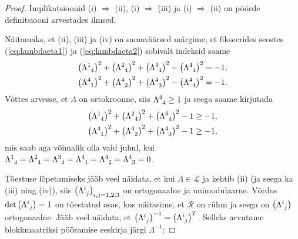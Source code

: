 \documentclass[12pt,a4paper,oneside]{article}
\theoremstyle{plain}
\theoremstyle{definition}
\numberwithin{equation}{section}
\def\L{{\mathcal L}}
\begin{document}
\begin{proof}
Implikatsioonid (i) $\Rightarrow$ (ii), (i) $\Rightarrow$ (iii) 
ja (i) $\Rightarrow$ (ii) on pöörde definitsiooni arvestades 
ilmsed.

Näitamaks, et (ii), (iii) ja (iv) on samaväärsed märgime, et 
fikseerides seostes (\ref{eq:lambdaeta1}) ja (\ref{eq:lambdaeta2}) 
sobivalt indeksid saame
\begin{align*}
\left(\Lambda\indices{^1_4}\right)^2 + 
	\left(\Lambda\indices{^2_4}\right)^2 + 
	\left(\Lambda\indices{^3_4}\right)^2 - 
	\left(\Lambda\indices{^4_4}\right)^2 = -1, \\
\left(\Lambda\indices{^4_1}\right)^2 + 
	\left(\Lambda\indices{^4_2}\right)^2 + 
	\left(\Lambda\indices{^4_3}\right)^2 - 
	\left(\Lambda\indices{^4_4}\right)^2 = -1.
\end{align*}
Võttes arvesse, et $\Lambda$ on ortokroonne, siis 
$\Lambda\indices{^4_4} \geq 1$ ja seega saame kirjutada
\begin{align*}
\left(\Lambda\indices{^1_4}\right)^2 + 
	\left(\Lambda\indices{^2_4}\right)^2 + 
	\left(\Lambda\indices{^3_4}\right)^2 - 1 \geq -1, \\
\left(\Lambda\indices{^4_1}\right)^2 + 
	\left(\Lambda\indices{^4_2}\right)^2 + 
	\left(\Lambda\indices{^4_3}\right)^2 - 1 \geq -1,
\end{align*}
mis saab aga võimalik olla vaid juhul, kui 
$\Lambda\indices{^1_4} = \Lambda\indices{^2_4} = 
\Lambda\indices{^3_4} = \Lambda\indices{^4_1} = 
\Lambda\indices{^4_2} = \Lambda\indices{^4_3} = 0$.

Tõestuse lõpetamiseks jääb veel näidata, et kui 
$\Lambda \in \L$ ja kehtib (ii) (ja seega ka (iii) ning 
(iv)), siis $\left(\Lambda\indices{^i_j}\right)_{i,j = 1, 2, 3}$ 
on ortogonaalne ja unimodulaarne. Võrdus 
$\det \left(\Lambda\indices{^i_j}\right) = 1$ on tõestatud osas, kus 
näitasime, et $\mathcal{R}$ on rühm ja seega on 
$\left(\Lambda\indices{^i_j}\right)$ ortogonaalne. 
Jääb veel näidata, et $\left(\Lambda\indices{^i_j}\right)^{-1} = 
\left(\Lambda\indices{^i_j}\right)^T$. Selleks arvutame 
blokkmaatriksi pööramise eeskirja järgi $\Lambda^{-1}$:


\end{proof}
\end{document}
